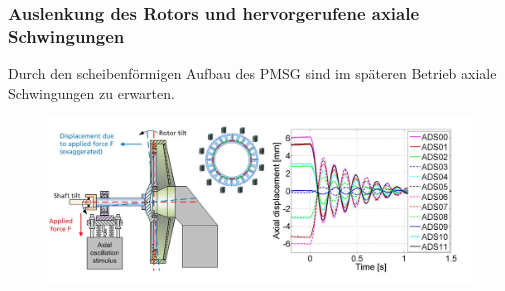 \documentclass[serif,11pt, xcolor=table]{beamer}
\begin{document}
\begin{frame}
		\frametitle{Auslenkung des Rotors und hervorgerufene axiale Schwingungen}
\tiny{Durch den scheibenförmigen Aufbau des PMSG sind im späteren Betrieb axiale Schwingungen zu erwarten.} 		
		\begin{figure}[htbp]
			\centering
			\includegraphics[scale=0.32]{Abbildungen/Auslenkung.JPG}
			
		\end{figure}	
		
	\end{frame}
\end{document}
